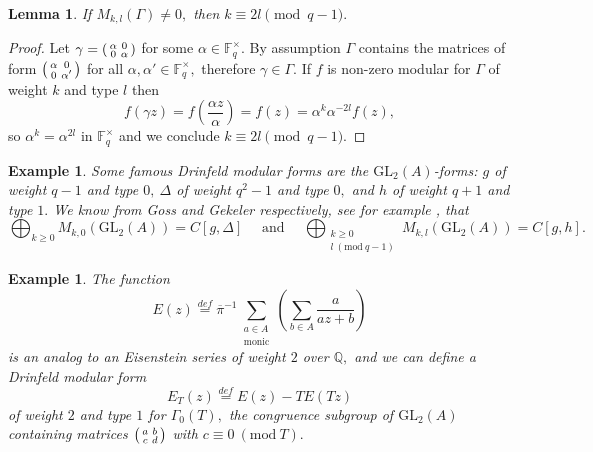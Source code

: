 \documentclass[11pt]{amsart}
\newtheorem{lemma}[theorem]{Lemma}
\newtheorem{example}[theorem]{Example}
\theoremstyle{definition}
\newenvironment{psmallmatrix}
{\left(\begin{smallmatrix}}
	{\end{smallmatrix}\right)}
\numberwithin{equation}{section}
\newcommand{\GL}{\mathrm{GL}} 	%
\newcommand{\bbF}{\mathbb{F}}		%
\newcommand{\bbQ}{\mathbb{Q}}		%
\newcommand{\Mod}[1]{\ (\mathrm{mod}\ #1)}
\begin{document}
		\begin{lemma}\cite[Remark $(5.8.\mathrm{i})$]{Gekeler-Coeff}\label{l: weight-type}
			If $M_{k,l}(\Gamma)\neq 0,$ then $k\equiv 2l\pmod{q-1}.$
		\end{lemma}
		\begin{proof}
			Let $\displaystyle{\gamma=\begin{psmallmatrix}\alpha&0\\0&\alpha\end{psmallmatrix}}$ for some $\alpha\in \bbF_q^{\times}.$ By assumption $\Gamma$ contains the matrices of form $\displaystyle{\begin{psmallmatrix}\alpha&0\\0&\alpha'\end{psmallmatrix}}$ for all $\alpha,\alpha'\in \bbF_q^{\times},$ therefore $\gamma\in \Gamma.$ If $f$ is non-zero modular for $\Gamma$ of weight $k$ and type $l$ then \[f(\gamma z)=f\left(\frac{\alpha z}{\alpha}\right)=f(z)=\alpha^k\alpha^{-2l}f(z), \]
			so $\alpha^k=\alpha^{2l}$ in $\bbF_q^{\times}$ and we conclude $k\equiv 2l\pmod{q-1}.$ 
		\end{proof}
		
		\begin{example}
			Some famous Drinfeld modular forms are the $\GL_2(A)$-forms: $g$ of weight $q-1$ and type $0, ~\Delta$ of weight $q^2-1$ and type $0,$ and $h$ of weight $q+1$ and type $1.$ We know from Goss and Gekeler respectively, see for example \cite[Theorem $(3.12)$]{Gekeler-survey-Drinfeld-modular-forms}, that 
			\[\bigoplus_{k\geq 0} M_{k,0}(\GL_2(A))=C[g,\Delta] \quad \text{ and }\quad \bigoplus_{\substack{k\geq 0\\l\Mod{q-1}}} M_{k,l}(\GL_2(A))=C[g,h].\]
		\end{example}
		
		\begin{example}\cite[Section $8$]{Gekeler-Coeff}
		\label{example: Eisenstein series for Gamma0(T)}
			The function \[E(z)\overset{def}{=}\overline{\pi}^{-1}\sum\limits_{\substack{a\in A\\\text{monic}}}\left(\sum_{b\in A}\frac{a}{az+b}\right)\]
			is an analog to an Eisenstein series of weight $2$ over $\bbQ,$ and we can define a Drinfeld modular form 
			\[E_T(z)\overset{def}{=}E(z)-TE(Tz)\]
			of weight $2$ and type $1$ for $\Gamma_0(T),$ the congruence subgroup of $\GL_2(A)$ containing matrices $\displaystyle{\begin{psmallmatrix}a&b\\c&d\end{psmallmatrix}}$ with $c\equiv 0\Mod T.$
		\end{example}
		
\end{document}
